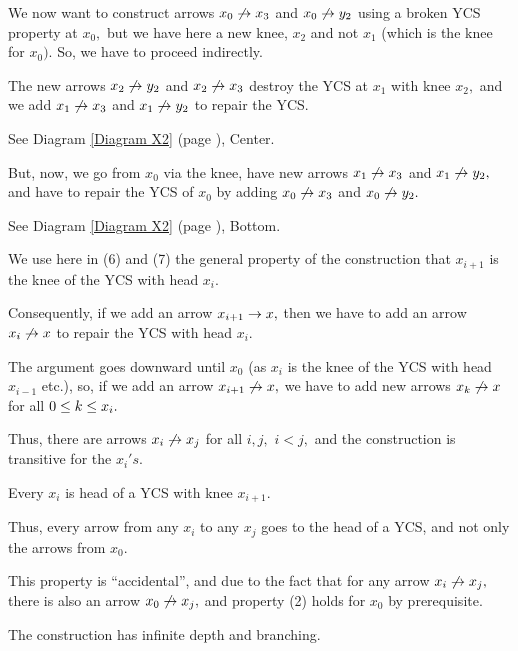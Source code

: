  \xDH
We now want to construct arrows $x_{0} \not\rightarrow x_{3}$ and $x_{0} \not\rightarrow y_{2}$
using a broken YCS
property at $x_{0},$ but we have here a new knee, $x_{2}$ and not $x_{1}$
(which is
the knee for $x_{0}).$ So, we have to proceed indirectly.

 \xDH
The new arrows $x_{2} \not\rightarrow y_{2}$ and $x_{2} \not\rightarrow x_{3}$ destroy the YCS
at $x_{1}$ with knee $x_{2},$
and we add $x_{1} \not\rightarrow x_{3}$ and $x_{1} \not\rightarrow y_{2}$ to repair the YCS.

See Diagram \ref{Diagram X2} (page \pageref{Diagram X2}), Center.

 \xDH
But, now, we go from $x_{0}$ via the knee, have new arrows
$x_{1} \not\rightarrow x_{3}$ and $x_{1} \not\rightarrow y_{2},$ and have to repair the YCS of
$x_{0}$ by adding
$x_{0} \not\rightarrow x_{3}$ and $x_{0} \not\rightarrow y_{2}.$

See Diagram \ref{Diagram X2} (page \pageref{Diagram X2}), Bottom.

 \xDH
We use here in (6) and (7) the general property of the construction
that $x_{i+1}$ is the knee of the YCS with head $x_{i}.$

Consequently, if we add an arrow $x_{i+1} \rightarrow x,$ then we have to add an
arrow $x_{i} \not\rightarrow x$
to repair the YCS with head $x_{i}.$

The argument goes downward until $x_{0}$ (as $x_{i}$ is the knee of the
YCS with head
$x_{i-1}$ etc.), so, if we add an arrow $x_{i+1} \not\rightarrow x,$ we have to add
new arrows
$x_{k} \not\rightarrow x$ for all $0 \leq k \leq x_{i}.$

 \xDH
 \xEh
 \xDH
Thus, there are arrows $x_{i} \not\rightarrow x_{j}$ for all $i,j,$ $i<j,$ and the
construction is
transitive for the $x_{i}' s.$

 \xDH
Every $x_{i}$ is head of a YCS with knee $x_{i+1}.$

 \xDH
Thus, every arrow from any $x_{i}$ to any $x_{j}$ goes to the head of a
YCS, and
not only the arrows from $x_{0}.$

This property is ``accidental'', and due to the fact that for any arrow
$x_{i} \not\rightarrow x_{j},$ there is also an arrow $x_{0} \not\rightarrow x_{j},$ and
property (2) holds for $x_{0}$
by prerequisite.

 \xEj

 \xDH
The construction has infinite depth and branching.

 \xEj


\clearpage


